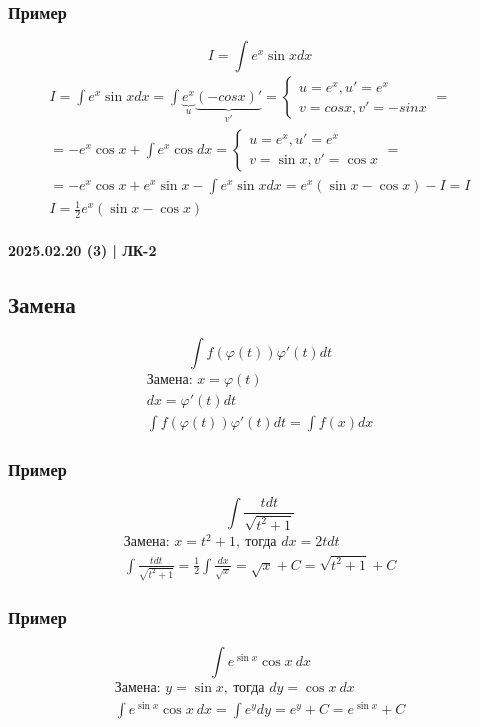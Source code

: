 \documentclass{article}
\begin{document}
\subsubsection{Пример}
\[
    I = \int e^x \sin x dx
\]
\begin{gather*}
    I = \int e^x \sin x dx = \int \underbrace{e^x}_{u} \underbrace{(-cos x)'}_{v'} = \begin{cases}
        u = e^x, u' = e^x \\
        v = cos x, v' = -sin x
    \end{cases} = \\ 
    = -e^x \cos x + \int e^x \cos dx = \begin{cases}
        u = e^x, u' = e^x \\
        v = \sin x, v' = \cos x
    \end{cases} = \\
    = -e^x \cos x + e^x \sin x - \int e^x \sin x dx = e^x (\sin x - \cos x) - I = I \\
    I = \frac{1}{2} e^x (\sin x - \cos x)
\end{gather*}


\paragraph{2025.02.20 (3) | ЛК-2}
\subsection{Замена}
\[
    \int f(\varphi(t)) \varphi'(t) dt
\]
\begin{gather*}
    \text{Замена: } x = \varphi(t) \\
    dx = \varphi'(t) dt \\
    \int f(\varphi(t)) \varphi'(t) dt = \int f(x)dx
\end{gather*}

\subsubsection{Пример}
\[
    \int \frac{tdt}{\sqrt{t^2 + 1}}
\]
\begin{gather*}
    \text{Замена: } x = t^2 + 1, ~\text{тогда } dx = 2tdt \\
    \int \frac{tdt}{\sqrt{t^2 + 1}} = \frac{1}{2} \int \frac{dx}{\sqrt{x}} = \sqrt{x} + C = \sqrt{t^2 + 1} + C
\end{gather*}

\subsubsection{Пример}
\[
    \int e^{\sin x} \cos x ~dx
\]
\begin{gather*}
    \text{Замена: } y = \sin x, ~\text{тогда } dy = \cos x ~dx \\
    \int e^{\sin x} \cos x ~dx = \int e^y dy = e^y + C = e^{\sin x} + C
\end{gather*}
\end{document}
